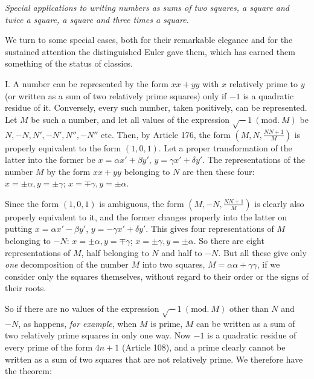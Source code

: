 \begin{center}
\textit{Special applications to writing numbers as sums of two squares, a square and twice a square, a square and three times a square.}
\end{center}

We turn to some special cases, both for their remarkable elegance and for the sustained attention the distinguished Euler gave them, which has earned them something of the status of classics.

I. A number can be represented by the form $xx+yy$ with $x$ relatively prime to $y$ (or written as a sum of
two relatively prime squares) only if $-1$ is a quadratic residue of it. Conversely, every such number, taken positively, can be represented. Let $M$ be such a number, and let all values of the expression $\surd-1\ (\mathrm{mod.}\ M)$ be $N,-N,N',-N',N'',-N''$ etc. Then, by Article 176, the form $(M,N,\frac{NN+1}{M})$ is properly equivalent to the form $(1,0,1)$. Let a proper transformation of the latter into the former be $x=\alpha x'+\beta y'$, $y=\gamma x'+\delta y'$. The representations of the number $M$ by the form $xx+yy$ belonging to $N$ are then these four: $x=\pm\alpha,y=\pm\gamma$; $x=\mp\gamma,y=\pm\alpha$.

Since the form $(1,0,1)$ is ambiguous, the form $(M,-N,\frac{NN+1}{M})$ is clearly also properly equivalent to it, and the former changes properly into the latter on putting $x=\alpha x'-\beta y'$, $y=-\gamma x'+\delta y'$. This gives four representations of $M$ belonging to $-N$: $x=\pm\alpha,y=\mp\gamma$; $x=\pm\gamma,y=\pm\alpha$. So there are eight representations of $M$, half belonging to $N$ and half to $-N$. But all these give only \textit{one} decomposition of the number $M$ into two squares, $M=\alpha\alpha+\gamma\gamma$, if we consider only the squares themselves, without regard to their order or the signs of their roots.

So if there are no values of the expression $\surd-1\ (\mathrm{mod.}\ M)$ other than $N$ and $-N$, as happens, \textit{for example}, when $M$ is prime, $M$ can be written as a sum of two relatively prime squares in only one way. Now $-1$ is a quadratic residue of every prime of the form $4n+1$ (Article 108), and a prime clearly cannot be written as a sum of two squares that are not relatively prime. We therefore have the theorem:

